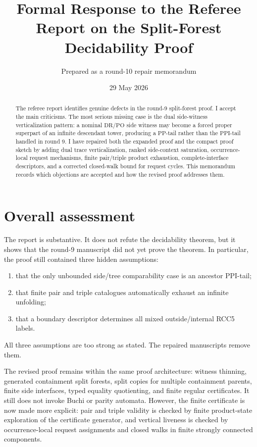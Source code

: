 \documentclass[11pt]{article}
\title{Formal Response to the Referee Report on the Split-Forest Decidability Proof}
\author{Prepared as a round-10 repair memorandum}
\date{29 May 2026}
\newcommand{\PP}{\mathrm{PP}}
\newcommand{\PPI}{\mathrm{PPI}}
\newcommand{\DR}{\mathrm{DR}}
\newcommand{\PO}{\mathrm{PO}}
\begin{document}
\maketitle

\begin{abstract}
The referee report identifies genuine defects in the round-9 split-forest proof.  I accept the main criticisms.  The most serious missing case is the dual side-witness verticalization pattern: a nominal $\DR/\PO$ side witness may become a forced proper superpart of an infinite descendant tower, producing a $\PP$-tail rather than the $\PPI$-tail handled in round 9.  I have repaired both the expanded proof and the compact proof sketch by adding dual trace verticalization, ranked side-context saturation, occurrence-local request mechanisms, finite pair/triple product exhaustion, complete-interface descriptors, and a corrected closed-walk bound for request cycles.  This memorandum records which objections are accepted and how the revised proof addresses them.
\end{abstract}

\section{Overall assessment}

The report is substantive.  It does not refute the decidability theorem, but it shows that the round-9 manuscript did not yet prove the theorem.  In particular, the proof still contained three hidden assumptions:
\begin{enumerate}
\item that the only unbounded side/tree comparability case is an ancestor $\PPI$-tail;
\item that finite pair and triple catalogues automatically exhaust an infinite unfolding;
\item that a boundary descriptor determines all mixed outside/internal RCC5 labels.
\end{enumerate}
All three assumptions are too strong as stated.  The repaired manuscripts remove them.

The revised proof remains within the same proof architecture: witness thinning, generated containment split forests, split copies for multiple containment parents, finite side interfaces, typed equality quotienting, and finite regular certificates.  It still does not invoke Buchi or parity automata.  However, the finite certificate is now made more explicit: pair and triple validity is checked by finite product-state exploration of the certificate generator, and vertical liveness is checked by occurrence-local request assignments and closed walks in finite strongly connected components.
\end{document}

